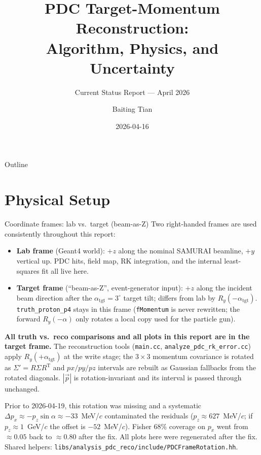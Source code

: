 \documentclass[aspectratio=169]{beamer}
\title[RK Reconstruction \& Error Analysis]{PDC Target-Momentum Reconstruction:\\Algorithm, Physics, and Uncertainty}
\subtitle{Current Status Report --- April 2026}
\author{Baiting Tian}
\institute{RIKEN Nishina Center / DPOL Experiment}
\date{2026-04-16}
\begin{document}
\begin{frame}
\titlepage
\end{frame}

\begin{frame}{Outline}
\tableofcontents
\end{frame}

\section{Physical Setup}

\begin{frame}{Coordinate frames: lab vs.\ target (beam-as-Z)}
\small
Two right-handed frames are used consistently throughout this report:
\begin{itemize}
  \item \textbf{Lab frame} (Geant4 world): $+z$ along the nominal SAMURAI beamline,
    $+y$ vertical up. PDC hits, field map, RK integration, and the
    internal least-squares fit all live here.
  \item \textbf{Target frame} (``beam-as-Z'', event-generator input):
    $+z$ along the incident beam direction after the $\alpha_\mathrm{tgt}=3^\circ$
    target tilt; differs from lab by $R_y(-\alpha_\mathrm{tgt})$.
    \texttt{truth\_proton\_p4} stays in this frame (\texttt{fMomentum} is never
    rewritten; the forward $R_y(-\alpha)$ only rotates a local copy used for the
    particle gun).
\end{itemize}

\textbf{All truth vs.\ reco comparisons and all plots in this report are in the target frame.}
The reconstruction tools (\texttt{main.cc}, \texttt{analyze\_pdc\_rk\_error.cc})
apply $R_y(+\alpha_\mathrm{tgt})$ at the write stage; the $3\times3$ momentum
covariance is rotated as $\Sigma'=R\Sigma R^\mathrm{T}$ and $px/py/pz$ intervals
are rebuilt as Gaussian fallbacks from the rotated diagonals. $|\vec p|$ is
rotation-invariant and its interval is passed through unchanged.

Prior to 2026-04-19, this rotation was missing and a systematic
$\Delta p_x \approx -p_z\sin\alpha \approx -33$~MeV/$c$ contaminated the residuals
($p_z \approx 627$~MeV/$c$; if $p_z\!\approx\!1$~GeV/$c$ the offset is $-52$~MeV/$c$).
Fisher 68\% coverage on $p_x$ went from $\approx 0.05$ back to $\approx 0.80$ after the fix.
All plots here were regenerated after the fix.
Shared helpers: \texttt{libs/analysis\_pdc\_reco/include/PDCFrameRotation.hh}.
\end{frame}
\end{document}
